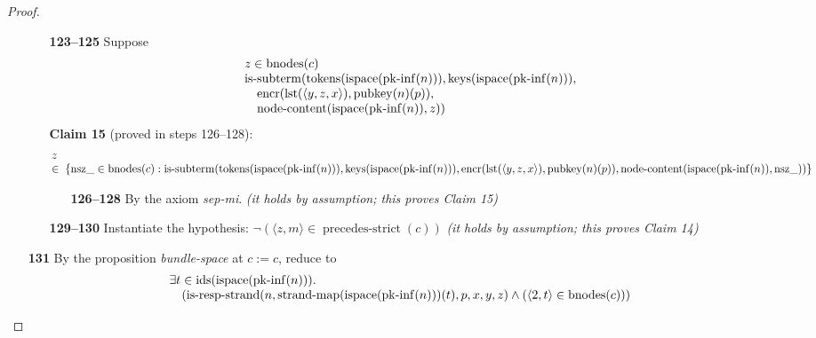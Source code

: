 \documentclass[11pt]{article}
\theoremstyle{plain}
\begin{document}
\begin{proof}
\begin{itemize}[leftmargin=2.8em, itemsep=4pt, parsep=1pt]
  \begin{itemize}[leftmargin=2.8em, itemsep=4pt, parsep=1pt]
  \item[\textbf{123--125}] Suppose 
\begin{equation*}
\begin{array}{@{}l@{}}
z \in \operatorname{bnodes}(c) \\
\begin{array}{@{}l@{}} \operatorname{is\text{-}subterm}(\operatorname{tokens}(\operatorname{ispace}(\operatorname{pk\text{-}inf}(n))), \operatorname{keys}(\operatorname{ispace}(\operatorname{pk\text{-}inf}(n))), \\ \quad \operatorname{encr}(\operatorname{lst}(\langle y, z, x \rangle), \operatorname{pubkey}(n)(p)), \\ \quad \operatorname{node\text{-}content}(\operatorname{ispace}(\operatorname{pk\text{-}inf}(n)), z)) \end{array}
\end{array}
\end{equation*}
\textbf{Claim 15} (proved in steps 126--128):
\begin{equation*}
\begin{array}{@{}l@{}} z \\ \in\; \{\operatorname{nsz\_} \in \operatorname{bnodes}(c) : \operatorname{is\text{-}subterm}(\operatorname{tokens}(\operatorname{ispace}(\operatorname{pk\text{-}inf}(n))), \operatorname{keys}(\operatorname{ispace}(\operatorname{pk\text{-}inf}(n))), \operatorname{encr}(\operatorname{lst}(\langle y, z, x \rangle), \operatorname{pubkey}(n)(p)), \operatorname{node\text{-}content}(\operatorname{ispace}(\operatorname{pk\text{-}inf}(n)), \operatorname{nsz\_}))\} \end{array}
\end{equation*}

  \begin{itemize}[leftmargin=2.8em, itemsep=4pt, parsep=1pt]
  \item[\textbf{126--128}] By the axiom \emph{sep-mi}.  \emph{(it holds by assumption; this proves Claim 15)}
  \end{itemize}
  \item[\textbf{129--130}] Instantiate the hypothesis: $\neg (\langle z, m \rangle \in \operatorname{precedes\text{-}strict}(c))$  \emph{(it holds by assumption; this proves Claim 14)}
  \end{itemize}
  \item[\textbf{131}] By the proposition \emph{bundle-space} at $c := c$, reduce to
\begin{equation*}
\begin{array}{@{}l@{}} \exists t \in \operatorname{ids}(\operatorname{ispace}(\operatorname{pk\text{-}inf}(n))). \\ \quad (\operatorname{is\text{-}resp\text{-}strand}(n, \operatorname{strand\text{-}map}(\operatorname{ispace}(\operatorname{pk\text{-}inf}(n)))(t), p, x, y, z) \wedge (\langle 2, t \rangle \in \operatorname{bnodes}(c))) \end{array}
\end{equation*}


\end{itemize}
\end{proof}
\end{document}

